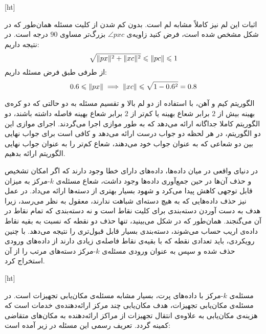 
[ht]


اثبات این لم نیز کاملاً مشابه لم  است.
بدون کم شدن از کلیت مسئله همان‌طور که در شکل  مشخص شده است، فرض کنید زاویه‌ی $\angle{pxc}$ بزرگ‌تر مساوی $90$ درجه است.
در نتیجه داریم:
$$\sqrt{\|{px}\|^2 + \|{xc}\|^2} \leqslant \|{pc}\| \leqslant 1$$
از طرفی طبق فرض مسئله داریم:
$$0.6 \leqslant \|{px}\| \implies \|{xc}\| \leqslant \sqrt{1 - 0.6^2} = 0.8$$


الگوریتم کیم و آهن، با استفاده از دو لم بالا و تقسیم مسئله به دو حالتی که دو کره‌ی بهینه بیش از $2$ برابر شعاع بهینه یا کم‌تر از $2$ برابر شعاع بهینه فاصله داشته باشند، دو الگوریتم کاملا جداگانه ارائه می‌دهد که به طور موازی اجرا می‌گردند.
اجرای موازی این دو الگوریتم، در هر لحظه دو جواب درست ارائه می‌دهد و کافی است برای جواب نهایی بین دو شعاعی که به عنوان جواب خود می‌دهند، شعاع کم‌تر را به عنوان جواب نهایی الگوریتم ارائه بدهیم.


در دنیای واقعی در میان داده‌ها، داده‌های دارای خطا وجود دارند که اگر امکان تشخیص و حذف آن‌ها در حین جمع‌آوری داده‌ها وجود داشت، شعاع مسئله‌ی $k$-مرکز به میزان قابل توجهی کاهش پیدا می‌کرد و شهود بسیار بهتری از دسته‌ها ارائه می‌داد.
در عمل نیز حذف داده‌هایی که به هیچ دسته‌ای شباهت ندارند، معقول به نظر می‌رسد، زیرا هدف به دست آوردن دسته‌بندی برای کلیت نقاط است و نه دسته‌بندی که تمام نقاط در آن می‌گنجند.
همان‌طور که در شکل  می‌بینید، تنها حذف دو نقطه که نسبت به بقیه نقاط داده‌ی اریب حساب می‌شوند، دسته‌بندی بسیار قابل قبول‌تری  را نتیجه می‌دهد.
با چنین رویکردی، باید تعدادی نقطه که با بقیه‌ی نقاط فاصله‌ی زیادی دارند از داده‌های ورودی حذف شده و سپس به عنوان ورودی مسئله‌ی $k$-مرکز دسته‌های مرتب را از آن استخراج کرد. 

[ht]

مسئله‌ی $k$-مرکز با داده‌های پرت، بسیار مشابه مسئله‌ی مکان‌یابی تجهیزات است.
در مسئله‌ی مکان‌یابی تجهیزات، هدف مکان‌یابی چند مرکز ارائه‌دهنده‌ی خدمات است که هزینه‌ی مکان‌یابی به علاوه‌ی انتقال تجهیزات از مراکز ارائه‌دهنده به مکان‌های متقاضی کمینه گردد.
تعریف رسمی این مسئله در زیر آمده است:

